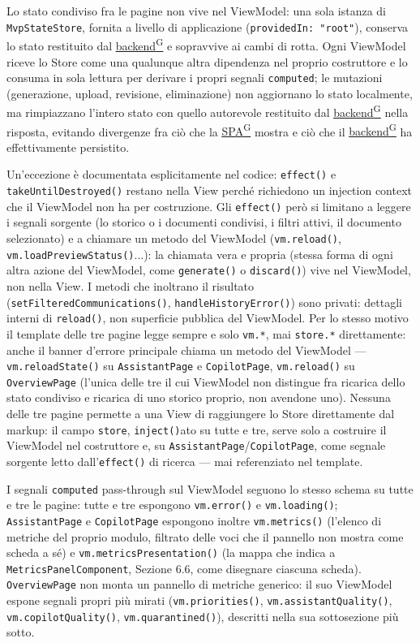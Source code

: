 \documentclass[a4paper,12pt]{article}
\providecommand{\glslink}[2]{\href{https://alittlebyte-19.github.io/Documentazione/glossario.html\#gls-#1}{\underline{#2}\textsuperscript{\scriptsize G}}}
\begin{document}
\begin{sloppypar}
Lo stato condiviso fra le pagine non vive nel ViewModel: una sola istanza di \texttt{MvpStateStore}, fornita a livello di applicazione (\texttt{providedIn: "root"}), conserva lo stato restituito dal \glslink{backend}{backend} e sopravvive ai cambi di rotta. Ogni ViewModel riceve lo Store come una qualunque altra dipendenza nel proprio costruttore e lo consuma in sola lettura per derivare i propri segnali \texttt{computed}; le mutazioni (generazione, upload, revisione, eliminazione) non aggiornano lo stato localmente, ma rimpiazzano l'intero stato con quello autorevole restituito dal \glslink{backend}{backend} nella risposta, evitando divergenze fra ciò che la \glslink{spa-single-page-application}{SPA} mostra e ciò che il \glslink{backend}{backend} ha effettivamente persistito.

Un'eccezione è documentata esplicitamente nel codice: \texttt{effect()} e \texttt{takeUntilDestroyed()} restano nella View perché richiedono un injection context che il ViewModel non ha per costruzione. Gli \texttt{effect()} però si limitano a leggere i segnali sorgente (lo storico o i documenti condivisi, i filtri attivi, il documento selezionato) e a chiamare un metodo del ViewModel (\texttt{vm.reload()}, \texttt{vm.loadPreviewStatus()}...): la chiamata vera e propria (stessa forma di ogni altra azione del ViewModel, come \texttt{generate()} o \texttt{discard()}) vive nel ViewModel, non nella View. I metodi che inoltrano il risultato (\texttt{setFilteredCommunications()}, \texttt{handleHistoryError()}) sono privati: dettagli interni di \texttt{reload()}, non superficie pubblica del ViewModel. Per lo stesso motivo il template delle tre pagine legge sempre e solo \texttt{vm.*}, mai \texttt{store.*} direttamente: anche il banner d'errore principale chiama un metodo del ViewModel — \texttt{vm.reloadState()} su \texttt{AssistantPage} e \texttt{CopilotPage}, \texttt{vm.reload()} su \texttt{OverviewPage} (l'unica delle tre il cui ViewModel non distingue fra ricarica dello stato condiviso e ricarica di uno storico proprio, non avendone uno). Nessuna delle tre pagine permette a una View di raggiungere lo Store direttamente dal markup: il campo \texttt{store}, \texttt{inject()}ato su tutte e tre, serve solo a costruire il ViewModel nel costruttore e, su \texttt{AssistantPage}/\texttt{CopilotPage}, come segnale sorgente letto dall'\texttt{effect()} di ricerca — mai referenziato nel template.

I segnali \texttt{computed} pass-through sul ViewModel seguono lo stesso schema su tutte e tre le pagine: tutte e tre espongono \texttt{vm.error()} e \texttt{vm.loading()}; \texttt{AssistantPage} e \texttt{CopilotPage} espongono inoltre \texttt{vm.metrics()} (l'elenco di metriche del proprio modulo, filtrato delle voci che il pannello non mostra come scheda a sé) e \texttt{vm.metricsPresentation()} (la mappa che indica a \texttt{MetricsPanelComponent}, Sezione 6.6, come disegnare ciascuna scheda). \texttt{OverviewPage} non monta un pannello di metriche generico: il suo ViewModel espone segnali propri più mirati (\texttt{vm.priorities()}, \texttt{vm.assistantQuality()}, \texttt{vm.copilotQuality()}, \texttt{vm.quarantined()}), descritti nella sua sottosezione più sotto.


\end{sloppypar}
\end{document}
